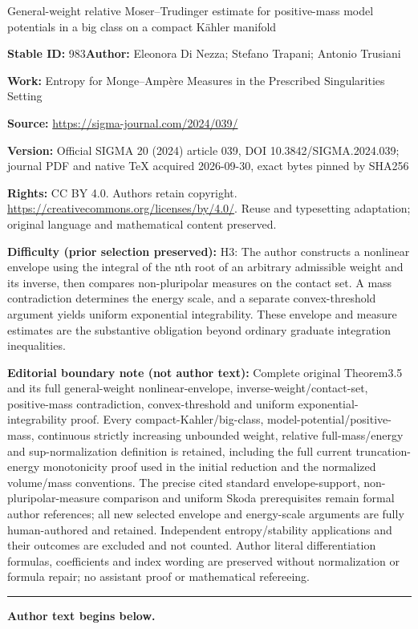 \documentclass[11pt]{article}
\numberwithin{equation}{section}
\numberwithin{equation}{section}
\theoremstyle{plain}
\begin{document}
\begin{center}\Large General-weight relative Moser–Trudinger estimate for positive-mass model potentials in a big class on a compact Kähler manifold\end{center}
\noindent\textbf{Stable ID:} 983\quad\textbf{Author:} Eleonora Di Nezza; Stefano Trapani; Antonio Trusiani\par
\noindent\textbf{Work:} Entropy for Monge--Amp\`ere Measures in the Prescribed Singularities Setting\par
\noindent\textbf{Source:} \url{https://sigma-journal.com/2024/039/}\par
\noindent\textbf{Version:} Official SIGMA 20 (2024) article 039, DOI 10.3842/SIGMA.2024.039; journal PDF and native TeX acquired 2026-09-30, exact bytes pinned by SHA256\par
\noindent\textbf{Rights:} CC BY 4.0. Authors retain copyright. \url{https://creativecommons.org/licenses/by/4.0/}. Reuse and typesetting adaptation; original language and mathematical content preserved.\par
\noindent\textbf{Difficulty (prior selection preserved):} {\CJKfont H3: The author constructs a nonlinear envelope using the integral of the nth root of an arbitrary admissible weight and its inverse, then compares non-pluripolar measures on the contact set. A mass contradiction determines the energy scale, and a separate convex-threshold argument yields uniform exponential integrability. These envelope and measure estimates are the substantive obligation beyond ordinary graduate integration inequalities.}\par
\medskip\noindent\textbf{Editorial boundary note (not author text):} Complete original Theorem3.5 and its full general-weight nonlinear-envelope, inverse-weight/contact-set, positive-mass contradiction, convex-threshold and uniform exponential-integrability proof. Every compact-Kahler/big-class, model-potential/positive-mass, continuous strictly increasing unbounded weight, relative full-mass/energy and sup-normalization definition is retained, including the full current truncation-energy monotonicity proof used in the initial reduction and the normalized volume/mass conventions. The precise cited standard envelope-support, non-pluripolar-measure comparison and uniform Skoda prerequisites remain formal author references; all new selected envelope and energy-scale arguments are fully human-authored and retained. Independent entropy/stability applications and their outcomes are excluded and not counted. Author literal differentiation formulas, coefficients and index wording are preserved without normalization or formula repair; no assistant proof or mathematical refereeing.\par
\medskip\hrule\medskip\noindent\textbf{Author text begins below.}\par
\setcounter{section}{1}
\end{document}
